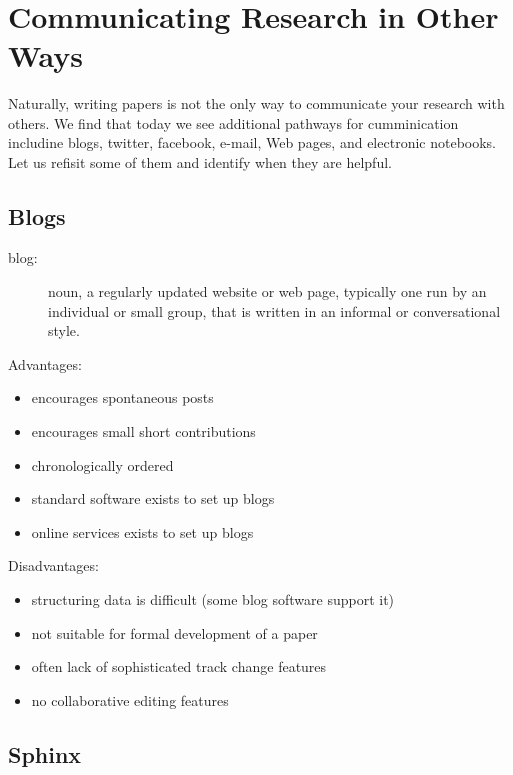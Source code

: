 \FILENAME\

\section{Communicating Research in Other Ways}\label{communicating-research}

Naturally, writing papers is not the only way to communicate your
research with others. We find that today we see additional pathways
for cumminication includine blogs, twitter, facebook, e-mail, Web
pages, and electronic notebooks. Let us refisit some of them and
identify when they are helpful.

\subsection{Blogs}\label{blogs}

\begin{description}
\item[blog:]
noun, a regularly updated website or web page, typically one run by an
individual or small group, that is written in an informal or
conversational style.
\end{description}

Advantages:

\begin{itemize}

\item
  encourages spontaneous posts
\item
  encourages small short contributions
\item
  chronologically ordered
\item
  standard software exists to set up blogs
\item
  online services exists to set up blogs
\end{itemize}

Disadvantages:

\begin{itemize}

\item
  structuring data is difficult (some blog software support it)
\item
  not suitable for formal development of a paper
\item
  often lack of sophisticated track change features
\item
  no collaborative editing features
\end{itemize}

\subsection{Sphinx}\label{sphinx}

